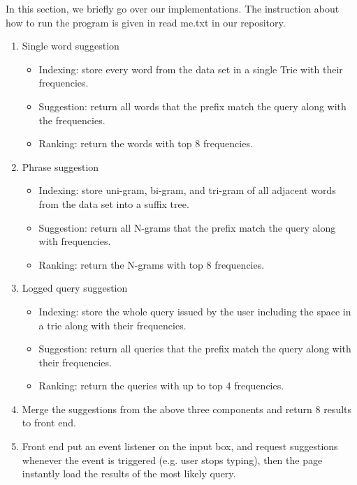 \documentclass{article}
\begin{document}
In this section, we briefly go over our implementations. The instruction about how to run the program is given in read me.txt in our repository. 
\begin{enumerate}
  \item Single word suggestion
  \begin{itemize}
  \item  Indexing: store every word from the data set in a single Trie with their frequencies.
  \item Suggestion: return all words that the prefix match the query along with the frequencies. 
  \item Ranking: return the words with top 8 frequencies.
\end{itemize}
	
	
  \item Phrase suggestion
  
  \begin{itemize} 
	\item Indexing: store uni-gram, bi-gram, and tri-gram of all adjacent words from the data set into a suffix tree.
	\item Suggestion: return all N-grams that the prefix match the query along with frequencies.
	\item Ranking: return the N-grams with top 8 frequencies.
\end{itemize}
  \item Logged query suggestion
  \begin{itemize} 

\item Indexing: store the whole query issued by the user including the space in a trie along with their frequencies.
\item Suggestion: return all queries that the prefix match the query along with their frequencies.
\item Ranking: return the queries with up to top 4 frequencies.
\end{itemize}

\item

Merge the suggestions from the above three components and return 8 results to front end.

\item

Front end put an event listener on the input box, and request suggestions whenever the event is triggered (e.g. user stops typing), then the page instantly load the results of the most likely query.
	

\end{enumerate}
\end{document}
